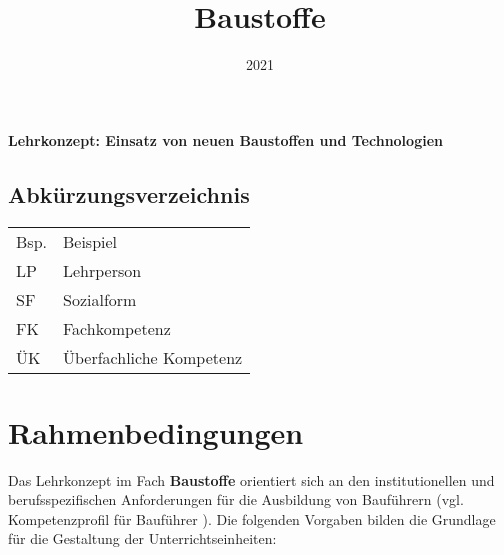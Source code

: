 \documentclass[
11pt,
captions=tableheading,
smallheadings,
headsepline,
footsepline, 
captions=tableheading,
parskip=half-,
]{scrartcl}
\title{Baustoffe}
\date{2021}
\begin{document}
\pagestyle{scrheadings}







{\color{blau_bauschule}\fontsize{40pt}{21pt}\selectfont \textbf{Lehrkonzept: Einsatz von neuen Baustoffen und Technologien}}

\clearpage
\vspace*{2cm}
\setcounter{tocdepth}{3} %
\tableofcontents%
\clearpage

\subsection*{Abkürzungsverzeichnis}
\begin{table}[H]
    \centering
    \label{tab:abkuerzungen}
    \begin{tabularx}{\textwidth}{@{}ll@{}}
        \toprule
        Bsp. & Beispiel                \\
        LP   & Lehrperson              \\
        SF   & Sozialform              \\
        FK   & Fachkompetenz           \\
        ÜK   & Überfachliche Kompetenz \\
        \bottomrule
    \end{tabularx}
\end{table}



\clearpage





\section{Rahmenbedingungen}


Das Lehrkonzept im Fach \textbf{Baustoffe} orientiert sich an den institutionellen und berufsspezifischen Anforderungen für die Ausbildung von Bauführern (vgl. Kompetenzprofil für Bauführer \cite{Kompetenzprofil_Baufuehrer}). Die folgenden Vorgaben bilden die Grundlage für die Gestaltung der Unterrichtseinheiten:
\end{document}
